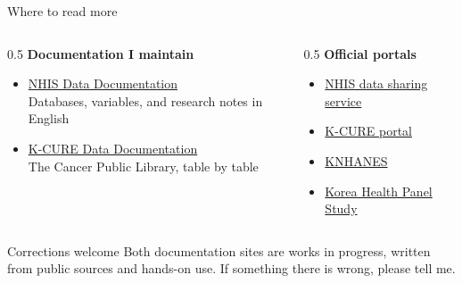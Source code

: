\documentclass[aspectratio=169,11pt]{beamer}
\begin{document}
\begin{frame}{Where to read more}
  \vspace{4pt}
  \begin{columns}[T]
    \begin{column}{0.5\textwidth}
      \textbf{\color{kdgreen}Documentation I maintain}
      \begin{itemize}\small
        \setlength{\itemsep}{7pt}
        \item \href{https://siho-park.github.io/nhis-documentation/}{NHIS Data Documentation}\\
              {\footnotesize\color{kdgray}Databases, variables, and research notes in English}
        \item \href{https://siho-park.github.io/kcure-documentation/}{K-CURE Data Documentation}\\
              {\footnotesize\color{kdgray}The Cancer Public Library, table by table}
      \end{itemize}
    \end{column}
    \begin{column}{0.5\textwidth}
      \textbf{\color{kdaccent}Official portals}
      \begin{itemize}\small
        \setlength{\itemsep}{7pt}
        \item \href{https://nhiss.nhis.or.kr/en/z/a/001/lpza001m01en.do}{NHIS data sharing service}
        \item \href{https://k-cure.mohw.go.kr/}{K-CURE portal}
        \item \href{https://knhanes.kdca.go.kr/knhanes/eng/intr/dataIntr.do}{KNHANES}
        \item \href{https://www.khp.re.kr:444/eng/main.do}{Korea Health Panel Study}
      \end{itemize}
    \end{column}
  \end{columns}
  \vspace{10pt}
  \begin{block}{Corrections welcome}
    Both documentation sites are works in progress, written from public sources and
    hands-on use. If something there is wrong, please tell me.
  \end{block}
\end{frame}
\end{document}

